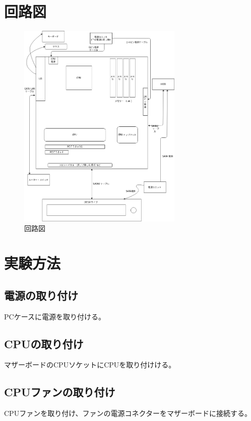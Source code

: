 \documentclass[10pt]{article}
\begin{document}
\section{回路図}
	\begin{figure}[H]
		\centering
		\includegraphics[width=0.704\textwidth]{pc.png}
		\caption{回路図}
	\end{figure}
\pagebreak

\section{実験方法}
	\subsection{電源の取り付け}
		\hspace{1cm} PCケースに電源を取り付ける。
	\subsection{CPUの取り付け}
		\hspace{1cm} マザーボードのCPUソケットにCPUを取り付けける。

\subsection{CPUファンの取り付け}
\hspace{1cm} CPUファンを取り付け、ファンの電源コネクターをマザーボードに接続する。			
\end{document}
